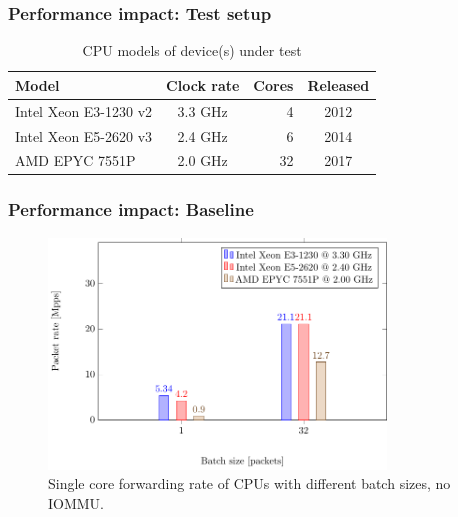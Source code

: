 \begin{frame}
    \frametitle{Performance impact: Test setup}

    \begin{table}
        \begin{tabular}{l | c | r | c  }
            Model                             & Clock rate & Cores & Released \\
            \hline
            Intel \hspace{0.2mm} Xeon E3-1230 v2 & 3.3 GHz & 4     & 2012     \\
            Intel \hspace{0.2mm} Xeon E5-2620 v3 & 2.4 GHz & 6     & 2014     \\
            AMD EPYC 7551P                       & 2.0 GHz & 32    & 2017
        \end{tabular}
        \caption{CPU models of device(s) under test}
    \end{table}
\end{frame}

\begin{frame}
    \frametitle{Performance impact: Baseline}

    \begin{figure}
        \centering
        \includegraphics[width=0.8\textwidth,clip]{figures/amd-intel-perf.pdf}
        \caption{Single core forwarding rate of CPUs with different batch sizes,
        no IOMMU.}
    \end{figure}
\end{frame}

